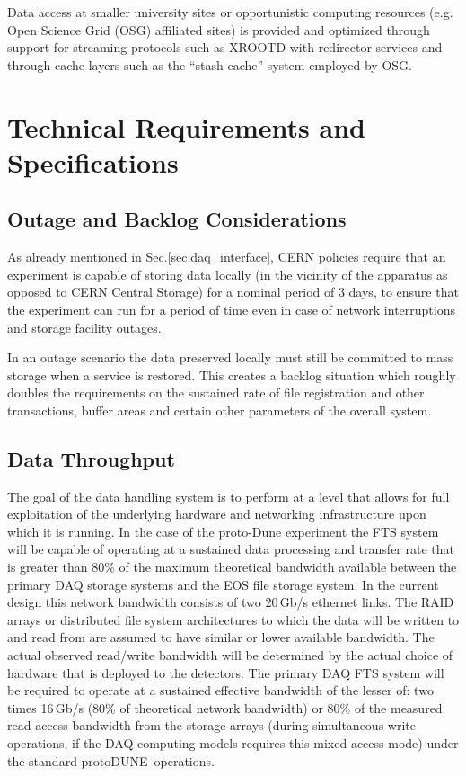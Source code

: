 \documentclass[pdftex,12pt,letter]{article}
\newcommand{\pd}{protoDUNE\ }
\begin{document}
Data access at smaller university sites or opportunistic computing resources (e.g. Open Science Grid (OSG)
affiliated sites) is provided and optimized through support for streaming protocols such as XROOTD with redirector
services and through cache layers such as the “stash cache” system employed by OSG.  

\section{Technical Requirements and Specifications}

\subsection{Outage and Backlog Considerations}
\label{sec:backlog}
As already mentioned in Sec.\ref{sec:daq_interface},
CERN policies require that an experiment is capable of storing data locally (in the vicinity of the apparatus as opposed to CERN Central
Storage)  for a nominal period of 3 days, to ensure that the experiment can run for a period of time even in case of network interruptions
and storage facility outages.

In an outage scenario the data preserved locally must still be committed to mass storage when a service is restored.
This creates a backlog situation which roughly doubles the requirements on the sustained rate of file registration and other transactions, buffer
areas and certain other parameters of the overall system.


\subsection{Data Throughput}

The goal of the data handling system is to perform at a level that allows for full exploitation of the underlying hardware and networking infrastructure
upon which  it is running.  In the case of the proto-Dune experiment the FTS system will be capable of operating at a sustained data processing and transfer
rate that is greater than 80\% of the maximum theoretical bandwidth available between the primary DAQ storage systems and the EOS file storage system.
 In the current design this network bandwidth consists of two 20\,Gb/s ethernet links.  The RAID arrays or distributed file system architectures to which the
data will be written to and read from are assumed to have similar or lower available bandwidth.  The actual observed read/write bandwidth will be determined
by the actual choice of hardware that is deployed to the detectors.  The primary DAQ FTS system will be required to operate at a sustained effective bandwidth
of the lesser of: two times 16\,Gb/s (80\% of theoretical network bandwidth) or 80\% of the measured read access bandwidth from the storage arrays
(during simultaneous write operations, if the DAQ computing models requires this mixed access mode) under the standard \pd operations.
\end{document}
